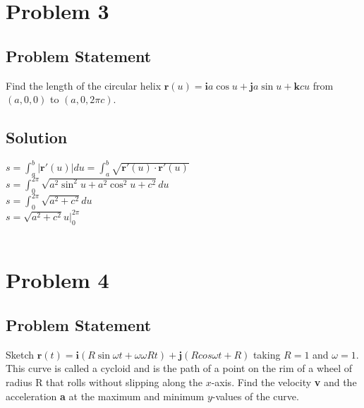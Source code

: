 \documentclass{article}
\begin{document}
    \pagebreak
    
    
    \section*{Problem 3}
    \subsection*{Problem Statement}
    Find the length of the circular helix $\mathbf{r}(u) = \mathbf{i} a \cos u + \mathbf{j} a \sin u + \mathbf{k}cu$ from $(a, 0, 0)$ to $(a, 0, 2\pi c)$.
    
    
    \subsection*{Solution}
    
    \begin{centering}
    
    $s = \int_a^b |\mathbf{r'}(u)| du = \int_a^b \sqrt{\mathbf{r'}(u) \cdot \mathbf{r'}(u)}$ \\
    $s = \int_0^{2\pi} \sqrt{a^2 \sin ^2 u + a^2 \cos^2 u + c^2} du$ \\
    $s = \int_0^{2\pi} \sqrt{a^2 + c^2} du$ \\
    $s = \sqrt{a^2 + c^2} u |_0^{2\pi}$ \\
     \\

	\end{centering}
    
    \pagebreak
    
    
    \section*{Problem 4}
    \subsection*{Problem Statement}
    
    Sketch $\mathbf{r}(t) = \mathbf{i}(R \sin \omega t + ω\omega Rt) + \mathbf{j}(R cos \omega t + R)$ taking $R = 1$ and $\omega = 1$. This curve is called a cycloid and is the path of a point on the rim of a wheel of radius R that rolls without slipping along the $x$-axis. Find the velocity {\bf v} and the acceleration {\bf a} at the maximum and minimum $y$-values of the curve.
    
\end{document}
